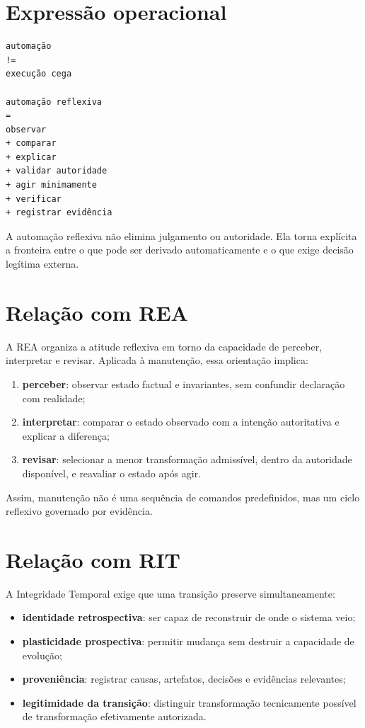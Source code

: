 \section{Expressão operacional}

\begin{verbatim}
automação
!=
execução cega

automação reflexiva
=
observar
+ comparar
+ explicar
+ validar autoridade
+ agir minimamente
+ verificar
+ registrar evidência
\end{verbatim}

A automação reflexiva não elimina julgamento ou autoridade. Ela torna explícita
a fronteira entre o que pode ser derivado automaticamente e o que exige decisão
legítima externa.

\section{Relação com REA}

A REA organiza a atitude reflexiva em torno da capacidade de perceber,
interpretar e revisar. Aplicada à manutenção, essa orientação implica:

\begin{enumerate}
  \item \textbf{perceber}: observar estado factual e invariantes, sem confundir
  declaração com realidade;
  \item \textbf{interpretar}: comparar o estado observado com a intenção
  autoritativa e explicar a diferença;
  \item \textbf{revisar}: selecionar a menor transformação admissível, dentro da
  autoridade disponível, e reavaliar o estado após agir.
\end{enumerate}

Assim, manutenção não é uma sequência de comandos predefinidos, mas um ciclo
reflexivo governado por evidência.

\section{Relação com RIT}

A Integridade Temporal exige que uma transição preserve simultaneamente:

\begin{itemize}
  \item \textbf{identidade retrospectiva}: ser capaz de reconstruir de onde o
  sistema veio;
  \item \textbf{plasticidade prospectiva}: permitir mudança sem destruir a
  capacidade de evolução;
  \item \textbf{proveniência}: registrar causas, artefatos, decisões e
  evidências relevantes;
  \item \textbf{legitimidade da transição}: distinguir transformação
  tecnicamente possível de transformação efetivamente autorizada.
\end{itemize}


